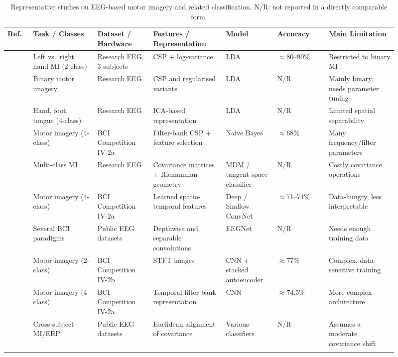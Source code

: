 \documentclass[pdflatex,sn-mathphys-num]{sn-jnl}%
\theoremstyle{thmstyleone}%
\theoremstyle{thmstyletwo}%
\theoremstyle{thmstylethree}%
\begin{document}
\begin{table}[t]
\centering
\caption{Representative studies on EEG-based motor imagery and related classification. N/R: not reported in a directly comparable form.}
\label{tab:litreview}
\footnotesize
\setlength{\tabcolsep}{2.5pt}
\begin{tabular}{@{}p{0.06\linewidth}p{0.15\linewidth}p{0.13\linewidth}p{0.17\linewidth}p{0.12\linewidth}p{0.12\linewidth}p{0.16\linewidth}@{}}
\toprule
Ref. & Task / Classes & Dataset / Hardware & Features / Representation & Model & Accuracy & Main Limitation \\
\midrule
\cite{Ramoser2000} & Left vs.\ right hand MI (2-class) & Research EEG, 3 subjects & CSP + log-variance & LDA & $\approx$80--90\% & Restricted to binary MI \\ \addlinespace
\cite{Blankertz2008} & Binary motor imagery & Research EEG & CSP and regularised variants & LDA & N/R & Mainly binary; needs parameter tuning \\ \addlinespace
\cite{Naeem2006} & Hand, foot, tongue (4-class) & Research EEG & ICA-based representation & LDA & N/R & Limited spatial separability \\ \addlinespace
\cite{Ang2012} & Motor imagery (4-class) & BCI Competition IV-2a & Filter-bank CSP + feature selection & Naive Bayes & $\approx$68\% & Many frequency/filter parameters \\ \addlinespace
\cite{Barachant2012} & Multi-class MI & Research EEG & Covariance matrices + Riemannian geometry & MDM / tangent-space classifier & N/R & Costly covariance operations \\ \addlinespace
\cite{Schirrmeister2017} & Motor imagery (4-class) & BCI Competition IV-2a & Learned spatio-temporal features & Deep / Shallow ConvNet & $\approx$71--74\% & Data-hungry, less interpretable \\ \addlinespace
\cite{Lawhern2018} & Several BCI paradigms & Public EEG datasets & Depthwise and separable convolutions & EEGNet & N/R & Needs enough training data \\ \addlinespace
\cite{Tabar2017} & Motor imagery (2-class) & BCI Competition IV-2b & STFT images & CNN + stacked autoencoder & $\approx$77\% & Complex, data-sensitive training \\ \addlinespace
\cite{Sakhavi2018} & Motor imagery (4-class) & BCI Competition IV-2a & Temporal filter-bank representation & CNN & $\approx$74.5\% & More complex architecture \\ \addlinespace
\cite{He2020} & Cross-subject MI/ERP & Public EEG datasets & Euclidean alignment of covariance & Various classifiers & N/R & Assumes a moderate covariance shift \\ \addlinespace

\end{tabular}
\end{table}
\end{document}
